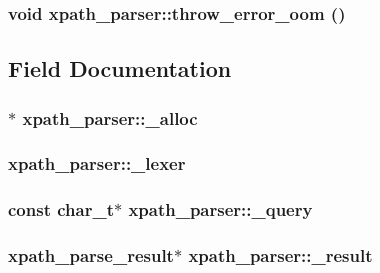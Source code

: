 \label{structxpath__parser_a043353db574741cd4f460a042a0b22c6}
\hypertarget{structxpath__parser_aeb5c7d7a6f8c5705a769297f42960c3e}{
\subsubsection[{throw\_\-error\_\-oom}]{\setlength{\rightskip}{0pt plus 5cm}void xpath\_\-parser::throw\_\-error\_\-oom ()}}
\label{structxpath__parser_aeb5c7d7a6f8c5705a769297f42960c3e}


\subsection{Field Documentation}
\hypertarget{structxpath__parser_ac34f5b21ef406bec944286eee2f45836}{
\subsubsection[{\_\-alloc}]{$\ast$ {\bf xpath\_\-parser::\_\-alloc}}}
\label{structxpath__parser_ac34f5b21ef406bec944286eee2f45836}
\hypertarget{structxpath__parser_a50106db584946e67acd080ef5391a0f4}{
\subsubsection[{\_\-lexer}]{ {\bf xpath\_\-parser::\_\-lexer}}}
\label{structxpath__parser_a50106db584946e67acd080ef5391a0f4}
\hypertarget{structxpath__parser_aaf5ea5d5be97cdd93adc7a719d8edc1c}{
\subsubsection[{\_\-query}]{\setlength{\rightskip}{0pt plus 5cm}const char\_\-t$\ast$ {\bf xpath\_\-parser::\_\-query}}}
\label{structxpath__parser_aaf5ea5d5be97cdd93adc7a719d8edc1c}
\hypertarget{structxpath__parser_a9370fb875bfc49ca6e35f3165ecb1692}{
\subsubsection[{\_\-result}]{\setlength{\rightskip}{0pt plus 5cm}xpath\_\-parse\_\-result$\ast$ {\bf xpath\_\-parser::\_\-result}}}
